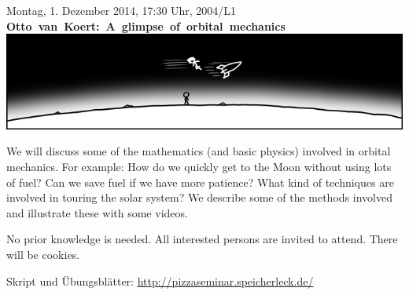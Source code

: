\documentclass[a4paper,ngerman,landscape]{scrartcl}
\begin{document}
\begin{center}
  \Huge
  \vspace*{0.0em}
  Montag, 1. Dezember 2014, 17:30 Uhr, 2004/L1 \\
  \mbox{\textbf{Otto van Koert: A glimpse of orbital mechanics}}
  \vfill
  \vspace{0.3em}
  \includegraphics[scale=1.00]{orbit-wide}
  \vfill

  \huge
  \begin{minipage}{0.80\textwidth}
    \setlength\parskip{\medskipamount}
    \vspace{0.3em}
    We will discuss some of the mathematics (and basic physics) involved in
    orbital mechanics. For example: How do we quickly get to the Moon
    without using lots of fuel? Can we save fuel if we have more patience? What
    kind of techniques are involved in touring the solar system? We
    describe some of the methods involved and illustrate these with some videos.

    No prior knowledge is needed. All interested persons are invited to attend.
    There will be cookies.

    \vspace{1em}
    \hfill\small Skript und Übungsblätter: \url{http://pizzaseminar.speicherleck.de/}
  \end{minipage}
\end{center}
\end{document}
